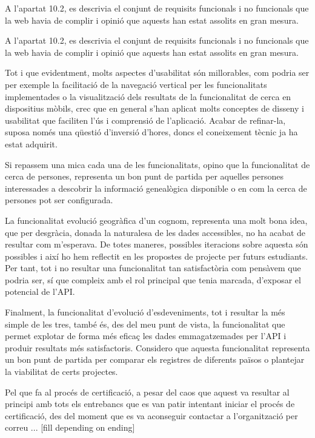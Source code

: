     A l’apartat 10.2, es descrivia el conjunt de requisits funcionals i no funcionals que la web havia de complir i opinió que aquests han estat assolits en gran mesura.

    A l’apartat 10.2, es descrivia el conjunt de requisits funcionals i no funcionals que la web havia de complir i opinió que aquests han estat assolits en gran mesura.

    Tot i que evidentment, molts aspectes d’usabilitat són millorables, com podria ser per exemple la facilitació de la navegació vertical per les funcionalitats implementades o la visualització dels resultats de la funcionalitat de cerca en dispositius mòbils, crec que en general s’han aplicat molts conceptes de disseny i usabilitat que faciliten l’ús i comprensió de l’aplicació. Acabar de refinar-la, suposa només una qüestió d’inversió d’hores, doncs el coneixement tècnic ja ha estat adquirit.

    Si repassem una mica cada una de les funcionalitats, opino que la funcionalitat de cerca de persones, representa un bon punt de partida per aquelles persones interessades a descobrir la informació genealògica disponible o en com la cerca de persones pot ser configurada.

    La funcionalitat evolució geogràfica d’un cognom, representa una molt bona idea, que per desgràcia, donada la naturalesa de les dades accessibles, no ha acabat de resultar com m’esperava. De totes maneres, possibles iteracions sobre aquesta són possibles i així ho hem reflectit en les propostes de projecte per futurs estudiants. Per tant, tot i no resultar una funcionalitat tan satisfactòria com pensàvem que podria ser, sí que compleix amb el rol principal que tenia marcada, d’exposar el potencial de l’API.

    Finalment, la funcionalitat d’evolució d’esdeveniments, tot i resultar la més simple de les tres, també és, des del meu punt de vista, la funcionalitat que permet explotar de forma més eficaç les dades emmagatzemades per l’API i produir resultats més satisfactoris. Considero que aquesta funcionalitat representa un bon punt de partida per comparar els registres de diferents països o plantejar la viabilitat de certs projectes.

    Pel que fa al procés de certificació, a pesar del caos que aquest va resultar al principi amb tots els entrebancs que es van patir intentant iniciar el procés de certificació, des del moment que es va aconseguir contactar a l’organització per correu ... [fill depending on ending]
